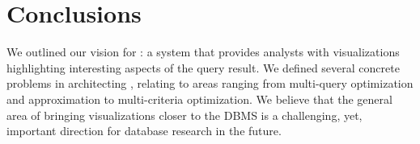 \section{Conclusions}\label{sec:conclusions}
\noindent We outlined our vision for \SeeDB: a system that provides analysts
with visualizations highlighting interesting aspects of the query result. We
defined several concrete problems in architecting \SeeDB, relating to areas
ranging from multi-query optimization and approximation to multi-criteria
optimization. We believe that the general area of bringing visualizations closer
to the DBMS is a challenging, yet, important direction for database research in
the future.
